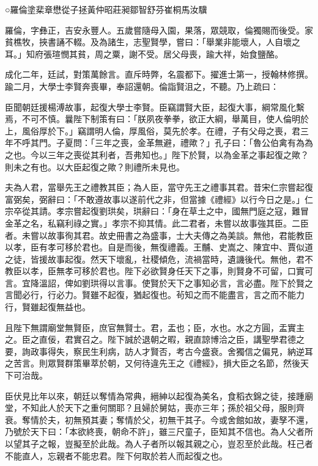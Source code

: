 
\begin{pinyinscope}
○羅倫塗棐章懋從子拯黃仲昭莊昶鄒智舒芬崔桐馬汝驥

羅倫，字彝正，吉安永豐人。五歲嘗隨母入園，果落，眾競取，倫獨賜而後受。家貧樵牧，挾書誦不輟。及為諸生，志聖賢學，嘗曰：「舉業非能壞人，人自壞之耳。」知府張瑄憫其貧，周之粟，謝不受。居父母喪，踰大祥，始食鹽酪。

成化二年，廷試，對策萬餘言。直斥時弊，名震都下。擢進士第一，授翰林修撰。踰二月，大學士李賢奔喪畢，奉詔還朝。倫詣賢沮之，不聽。乃上疏曰：

臣聞朝廷援楊溥故事，起復大學士李賢。臣竊謂賢大臣，起復大事，綱常風化繫焉，不可不慎。曩陛下制策有曰：「朕夙夜拳拳，欲正大綱，舉萬目，使人倫明於上，風俗厚於下。」竊謂明人倫，厚風俗，莫先於孝。在禮，子有父母之喪，君三年不呼其門。子夏問：「三年之喪，金革無避，禮歟？」孔子曰：「魯公伯禽有為為之也。今以三年之喪從其利者，吾弗知也。」陛下於賢，以為金革之事起復之歟？則未之有也。以大臣起復之歟？則禮所未見也。

夫為人君，當舉先王之禮教其臣；為人臣，當守先王之禮事其君。昔宋仁宗嘗起復富弼矣，弼辭曰：「不敢遵故事以遂前代之非，但當據《禮經》以行今日之是。」仁宗卒從其請。孝宗嘗起復劉珙矣，珙辭曰：「身在草土之中，國無門庭之寇，難冒金革之名，私竊利祿之實。」孝宗不抑其情。此二君者，未嘗以故事強其臣。二臣者。未嘗以故事徇其君。故史冊書之為盛事，士大夫傳之為美談。無他，君能教臣以孝，臣有孝可移於君也。自是而後，無復禮義。王黼、史嵩之、陳宜中、賈似道之徒，皆援故事起復。然天下壞亂，社稷傾危，流禍當時，遺譏後代。無他，君不教臣以孝，臣無孝可移於君也。陛下必欲賢身任天下之事，則賢身不可留，口實可言。宜降溫詔，俾如劉珙得以言事。使賢於天下之事知必言，言必盡。陛下於賢之言聞必行，行必力。賢雖不起復，猶起復也。茍知之而不能盡言，言之而不能力行，賢雖起復無益也。

且陛下無謂廟堂無賢臣，庶官無賢士。君，盂也；臣，水也。水之方圓，盂實主之。臣之直佞，君實召之。陛下誠於退朝之暇，親直諒博洽之臣，講聖學君德之要，詢政事得失，察民生利病，訪人才賢否，考古今盛衰。舍獨信之偏見，納逆耳之苦言。則眾賢群策畢萃於朝，又何待違先王之《禮經》，損大臣之名節，然後天下可治哉。

臣伏見比年以來，朝廷以奪情為常典，縉紳以起復為美名，食稻衣錦之徒，接踵廟堂，不知此人於天下之重何關耶？且婦於舅姑，喪亦三年；孫於祖父母，服則齊衰。奪情於夫，初無預其妻；奪情於父，初無干其子。今或舍館如故，妻孥不還，乃號於天下曰：「本欲終喪，朝命不許」，雖三尺童子，臣知其不信也。為人父者所以望其子之報，豈擬至於此哉。為人子者所以報其親之心，豈忍至於此哉。枉己者不能直人，忘親者不能忠君。陛下何取於若人而起復之也。


\end{pinyinscope}
